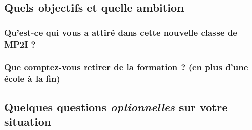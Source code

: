 \subsection*{Quels objectifs et quelle ambition}
\subsubsection*{Qu'est-ce qui vous a attiré dans cette nouvelle classe de MP2I ?}

\vspace*{40pt}

\subsubsection*{Que comptez-vous retirer de la formation ? (en plus d'une école à la fin)}

\vspace*{20pt}


\subsection*{Quelques questions \emph{optionnelles} sur votre situation}

